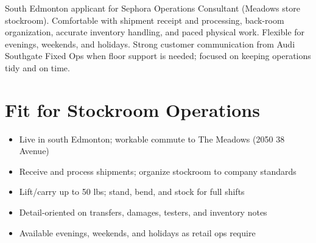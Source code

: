 \documentclass[11pt,a4paper,sans]{moderncv}
\begin{document}
\makecvtitle

\vspace{4pt}
\small{South Edmonton applicant for Sephora Operations Consultant (Meadows store stockroom). Comfortable with shipment receipt and processing, back-room organization, accurate inventory handling, and paced physical work. Flexible for evenings, weekends, and holidays. Strong customer communication from Audi Southgate Fixed Ops when floor support is needed; focused on keeping operations tidy and on time.}

\section{Fit for Stockroom Operations}
\vspace{1pt}
\begin{itemize}
\item Live in south Edmonton; workable commute to The Meadows (2050 38 Avenue)
\item Receive and process shipments; organize stockroom to company standards
\item Lift/carry up to 50 lbs; stand, bend, and stock for full shifts
\item Detail-oriented on transfers, damages, testers, and inventory notes
\item Available evenings, weekends, and holidays as retail ops require
\end{itemize}
\end{document}
